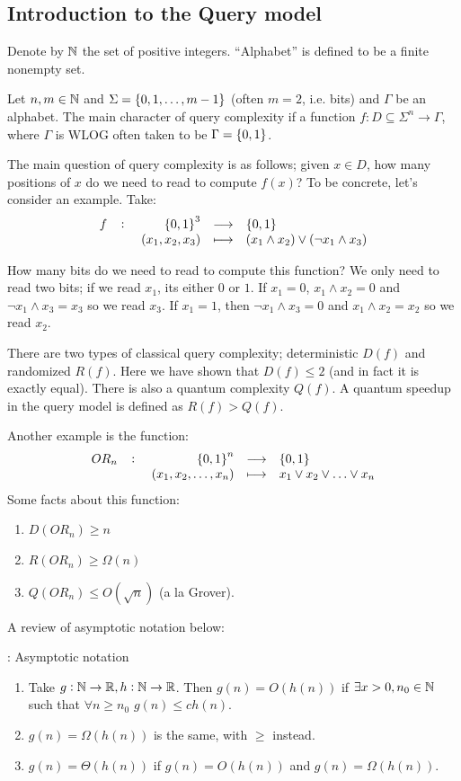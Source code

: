 \subsection*{Introduction to the Query model}
Denote by $\mathbb{N}$ the set of positive integers. ``Alphabet'' is defined to be a finite nonempty set. 

Let $n, m \in \mathbb{N}$ and $\Sigma = \set{0, 1, \ldots, m-1}$ (often $m = 2$, i.e. bits) and $\Gamma$ be an alphabet. The main character of query complexity if a function $f: D \subseteq \Sigma^n \to \Gamma$, where $\Gamma$ is WLOG often taken to be $\Gamma = \set{0, 1}$. 

The main question of query complexity is as follows; given $x \in D$, how many positions of $x$ do we need to read to compute $f(x)$? To be concrete, let's consider an example. Take:
\begin{equation}
    \fullfunction{f}{\set{0, 1}^3}{\set{0, 1}}{(x_1, x_2, x_3)}{(x_1 \land x_2) \lor (\lnot x_1 \land x_3)}
\end{equation}

How many bits do we need to read to compute this function? We only need to read two bits; if we read $x_1$, its either $0$ or $1$. If $x_1 = 0$, $x_1 \land x_2 = 0$ and $\lnot x_1 \land x_3 = x_3$ so we read $x_3$. If $x_1 = 1$, then $\lnot x_1 \land x_3 = 0$ and $x_1 \land x_2 = x_2$ so we read $x_2$.

There are two types of classical query complexity; deterministic $D(f)$ and randomized $R(f)$. Here we have shown that $D(f) \leq 2$ (and in fact it is exactly equal). There is also a quantum complexity $Q(f)$. A quantum speedup in the query model is defined as $R(f) > Q(f)$. 

Another example is the function:
\begin{equation}
    \fullfunction{OR_n}{\set{0, 1}^n}{\set{0, 1}}{(x_1, x_2, \ldots, x_n)}{x_1 \lor x_2 \lor \ldots \lor x_n}
\end{equation}
Some facts about this function:
\begin{enumerate}
    \item $D(OR_n) \geq n$
    \item $R(OR_n) \geq \Omega(n)$
    \item $Q(OR_n) \leq O(\sqrt{n})$ (a la Grover).
\end{enumerate}

A review of asymptotic notation below:
\begin{defbox}{: Asymptotic notation}
    \begin{enumerate}
        \item Take $g: \mathbb{N} \to \mathbb{R}, h: \mathbb{N} \to \mathbb{R}$. Then $g(n) = O(h(n))$ if $\exists x > 0, n_0 \in \mathbb{N}$ such that $\forall n \geq n_0$ $g(n) \leq ch(n)$. 
        \item $g(n) = \Omega(h(n))$ is the same, with $\geq$ instead.
        \item $g(n) = \Theta(h(n))$ if $g(n) = O(h(n))$ and $g(n) = \Omega(h(n))$. 
    \end{enumerate}
\end{defbox}

